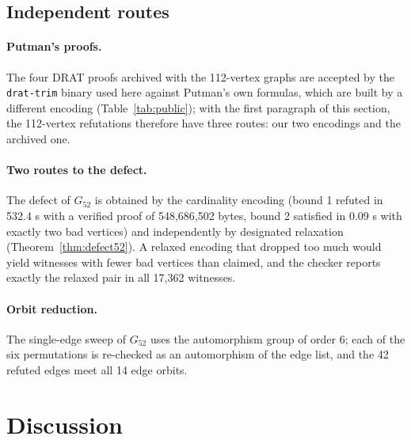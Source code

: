 \documentclass[11pt]{article}
\theoremstyle{definition}
\theoremstyle{remark}
\newcommand{\Gfty}{G_{52}}
\begin{document}
\subsection{Independent routes}

\paragraph{Putman's proofs.} The four DRAT proofs archived with the 112-vertex graphs are accepted by
the \texttt{drat-trim} binary used here against Putman's own formulas, which are built by a
different encoding (Table~\ref{tab:public}); with the first paragraph of this section, the 112-vertex
refutations therefore have three routes: our two encodings and the archived one.

\begin{table}[htbp]\centering\footnotesize\setlength{\tabcolsep}{6pt}

\caption{Putman's four archived DRAT proofs, with their sizes and the time the \texttt{drat-trim}
binary used here took to accept each against its archived formula (computation EXP-001).}\label{tab:public}
\end{table}

\paragraph{Two routes to the defect.} The defect of $\Gfty$ is obtained by the cardinality encoding
(bound 1 refuted in 532.4 s with a verified proof of 548{,}686{,}502 bytes, bound 2 satisfied in 0.09
s with exactly two bad vertices) and independently by designated relaxation (Theorem~\ref{thm:defect52}).
A relaxed encoding that dropped too much would yield witnesses with fewer bad vertices than claimed,
and the checker reports exactly the relaxed pair in all 17{,}362 witnesses.

\paragraph{Orbit reduction.} The single-edge sweep of $\Gfty$ uses the automorphism group of order 6; each of
the six permutations is re-checked as an automorphism of the edge list, and the 42 refuted edges
meet all 14 edge orbits.

\section{Discussion}\label{sec:discussion}
\end{document}
